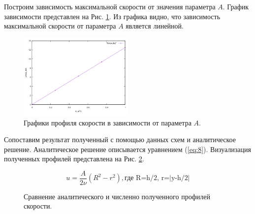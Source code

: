 Построим зависимость максимальной скорости от значения параметра $A$. График зависимости представлен на Рис. \ref{fig:8}. Из графика видно, что зависимость максимальной скорости от параметра $A$ является линейной. 
\begin{figure}[H]
    \centering
    \includegraphics[width=0.5\textwidth]{images/8.png}
    \caption {Графики профиля скорости в зависимости от параметра $A$.}
    \label{fig:8}
\end{figure}

Сопоставим результат полученный с помощью данных схем и аналитическое решение. Аналитическое решение описывается уравнением (\ref{eq:8}).
Визуализация полученных профилей представлена на Рис. \ref{fig:9}.

\begin{equation}
    u=\frac{A}{2\nu} (R^2-r^2), \text{где R=h/2, r=|y-h/2|}
\label{eq:8}
\end{equation}


\begin{figure}[H]
    \centering
    \hfill 
    \caption{Сравнение аналитического и численно полученного профилей скорости.}
    \label{fig:9}
\end{figure}

